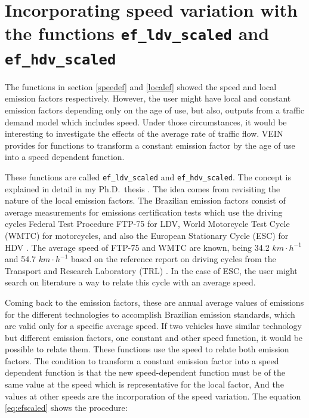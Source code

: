 \documentclass[12pt,graybox,envcountchap,sectrefs]{krantz}
\theoremstyle{definition}
\theoremstyle{definition}
\theoremstyle{definition}
\theoremstyle{remark}
\begin{document}
\section{\texorpdfstring{Incorporating speed variation with the
functions \texttt{ef\_ldv\_scaled} and
\texttt{ef\_hdv\_scaled}}{Incorporating speed variation with the functions ef\_ldv\_scaled and ef\_hdv\_scaled}}\label{scale}

The functions in section \ref{speedef} and \ref{localef} showed the
speed and local emission factors respectively. However, the user might
have local and constant emission factors depending only on the age of
use, but also, outputs from a traffic demand model which includes speed.
Under those circumstances, it would be interesting to investigate the
effects of the average rate of traffic flow. VEIN provides for functions
to transform a constant emission factor by the age of use into a speed
dependent function.

These functions are called \texttt{ef\_ldv\_scaled} and
\texttt{ef\_hdv\_scaled}. The concept is explained in detail in my
Ph.D.~thesis \citep{ibarrathesis}. The idea comes from revisiting the
nature of the local emission factors. The Brazilian emission factors
consist of average measurements for emissions certification tests which
use the driving cycles Federal Test Procedure FTP-75 for LDV, World
Motorcycle Test Cycle (WMTC) for motorcycles, and also the European
Stationary Cycle (ESC) for HDV \citep{CETESB2015}. The average speed of
FTP-75 and WMTC are known, being 34.2 \(km \cdot h^{-1}\) and 54.7
\(km \cdot h^{-1}\) based on the reference report on driving cycles from
the Transport and Research Laboratory (TRL) \citep{tim}. In the case of
ESC, the user might search on literature a way to relate this cycle with
an average speed.

Coming back to the \citet{CETESB2015} emission factors, these are annual
average values of emissions for the different technologies to accomplish
Brazilian emission standards, which are valid only for a specific
average speed. If two vehicles have similar technology but different
emission factors, one constant and other speed function, it would be
possible to relate them. These functions use the speed to relate both
emission factors. The condition to transform a constant emission factor
into a speed dependent function is that the new speed-dependent function
must be of the same value at the speed which is representative for the
local factor, And the values at other speeds are the incorporation of
the speed variation. The equation \eqref{eq:efscaled} shows the procedure:
\end{document}

